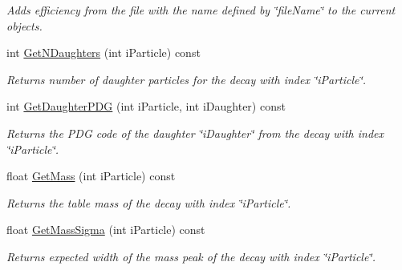 \begin{DoxyCompactItemize}
\begin{DoxyCompactList}\small\item\em Adds efficiency from the file with the name defined by \char`\"{}file\+Name\char`\"{} to the current objects. \end{DoxyCompactList}\item 
int \hyperlink{classKFPartEfficiencies_a5119b5c564e1ccc597181711ba241ca7}{Get\+N\+Daughters} (int i\+Particle) const \hypertarget{classKFPartEfficiencies_a5119b5c564e1ccc597181711ba241ca7}{}\label{classKFPartEfficiencies_a5119b5c564e1ccc597181711ba241ca7}

\begin{DoxyCompactList}\small\item\em Returns number of daughter particles for the decay with index \char`\"{}i\+Particle\char`\"{}. \end{DoxyCompactList}\item 
int \hyperlink{classKFPartEfficiencies_a5865d2d8022ffe45914511992a0af079}{Get\+Daughter\+P\+DG} (int i\+Particle, int i\+Daughter) const \hypertarget{classKFPartEfficiencies_a5865d2d8022ffe45914511992a0af079}{}\label{classKFPartEfficiencies_a5865d2d8022ffe45914511992a0af079}

\begin{DoxyCompactList}\small\item\em Returns the P\+DG code of the daughter \char`\"{}i\+Daughter\char`\"{} from the decay with index \char`\"{}i\+Particle\char`\"{}. \end{DoxyCompactList}\item 
float \hyperlink{classKFPartEfficiencies_ace9d9cf07aefb8e523ac1ec6b1bdcab0}{Get\+Mass} (int i\+Particle) const \hypertarget{classKFPartEfficiencies_ace9d9cf07aefb8e523ac1ec6b1bdcab0}{}\label{classKFPartEfficiencies_ace9d9cf07aefb8e523ac1ec6b1bdcab0}

\begin{DoxyCompactList}\small\item\em Returns the table mass of the decay with index \char`\"{}i\+Particle\char`\"{}. \end{DoxyCompactList}\item 
float \hyperlink{classKFPartEfficiencies_a9f6f8e28db6c1692b0ee9415c8e63c03}{Get\+Mass\+Sigma} (int i\+Particle) const \hypertarget{classKFPartEfficiencies_a9f6f8e28db6c1692b0ee9415c8e63c03}{}\label{classKFPartEfficiencies_a9f6f8e28db6c1692b0ee9415c8e63c03}

\begin{DoxyCompactList}\small\item\em Returns expected width of the mass peak of the decay with index \char`\"{}i\+Particle\char`\"{}. \end{DoxyCompactList}\end{DoxyCompactItemize}
